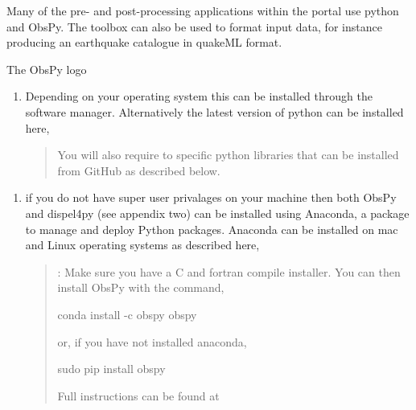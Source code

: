 \documentclass[english]{book}
\begin{document}
Many of the pre- and post-processing applications within the portal use
python and ObsPy. The toolbox can also be used to format input data, for
instance producing an earthquake catalogue in quakeML format.


 The ObsPy logo

\begin{enumerate}
\item {} 
 Depending on your operating system this can be
installed through the software manager. Alternatively the latest
version of python can be installed here,
\begin{quote}


You will also require to specific python libraries that can be
installed from GitHub as described below.
\end{quote}

\end{enumerate}
\begin{enumerate}
\item {} 
 if you do not have super user privalages on
your machine then both ObsPy and dispel4py (see appendix two) can be
installed using Anaconda, a package to manage and deploy Python
packages. Anaconda can be installed on mac and Linux operating
systems as described here,
\begin{quote}


: Make sure you have a C and fortran compile
installer. You can then install ObsPy with the command,

conda install -c obspy obspy

or, if you have not installed anaconda,

sudo pip install obspy

Full instructions can be found at

\end{quote}

\end{enumerate}

\end{document}
